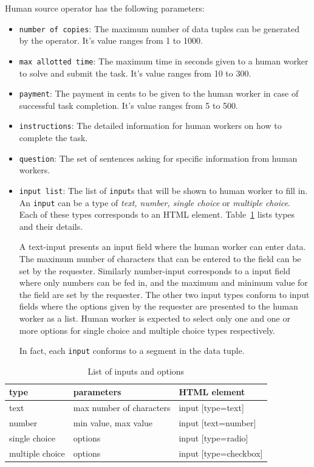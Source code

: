 Human source operator has the following parameters:
\begin{itemize}
	\item \texttt{number of copies}: The maximum number of data tuples can be 
	generated by the operator. It's value ranges from 1 to 1000.
	\item \texttt{max allotted time}: The maximum time in seconds given to a human 
	worker to solve and submit the task. It's value ranges from 10 to 300.
	\item \texttt{payment}: The payment in cents to be given to the human worker in 
	case of successful task completion. It's value ranges from 5 to 500.
	\item \texttt{instructions}: The detailed information for human workers on how to 
	complete the task.
	\item \texttt{question}: The set of sentences asking for specific information from 
	human workers.
	\item \texttt{input list}: The list of \texttt{input}s that will be shown to human worker 
	to fill in. An \texttt{input} can be a type of \textit{text, number, single choice} or 
	\textit{multiple choice}. Each of these types corresponds to an HTML element. 
	Table~\ref{tab:input list} lists types and their details.
	
	A text-input presents an input field where the human worker can 
	enter data. The maximum number of characters that can be entered to the field can be 
	set by the requester. Similarly number-input corresponds to a input field where only 
	numbers can be fed in, and the maximum and minimum value for the field are set by 
	the requester. The other two input types conform to input fields where the options given 
	by the requester are presented to the human worker as a list. Human worker is expected 
	to select only one and one or more options for single choice and multiple choice types 
	respectively.
	
	In fact, each \texttt{input} conforms to a segment in the data tuple.
\end{itemize}

\begin{table}[ht]
	\centering
	\caption{List of inputs and options}
	\label{tab:input list}
	\begin{tabular}{| l | l | l |}
		\hline
		type & parameters & HTML element \\ \hline
		text & max number of characters & input [type=text] \\ \hline
		number & min value, max value & input [text=number] \\ \hline
		single choice & options & input [type=radio] \\ \hline
		multiple choice & options & input [type=checkbox] \\ \hline
	\end{tabular}
\end{table} 



